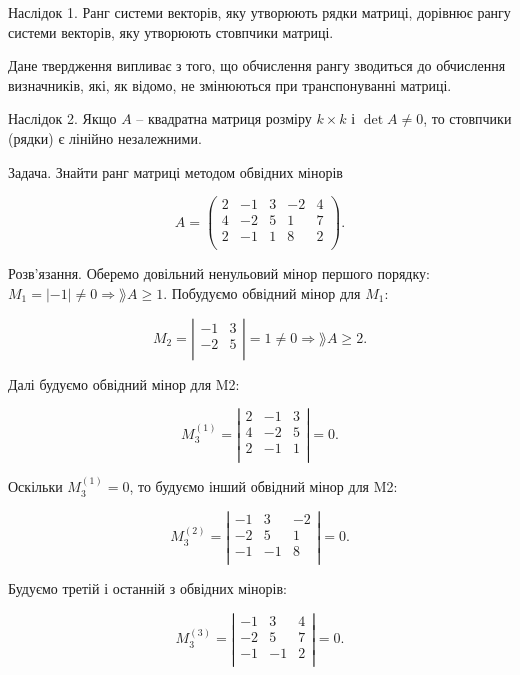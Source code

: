 Наслідок 1. Ранг системи векторів, яку утворюють рядки матриці, дорівнює
рангу системи векторів, яку утворюють стовпчики матриці.


Дане твердження випливає з того, що обчислення рангу зводиться до
обчислення визначників, які, як відомо, не змінюються при транспонуванні
матриці.


Наслідок 2. Якщо $A$ -- квадратна матриця розміру $k \times k$ і $\det A \neq 0$, то
стовпчики (рядки) є лінійно незалежними.


Задача. Знайти ранг матриці методом обвідних мінорів

$$A = \begin{pmatrix}
	2 & -1 & 3 & -2 & 4 \\
	4 & -2 & 5 &  1 & 7 \\
	2 & -1 & 1 &  8 & 2	\\
\end{pmatrix}.$$

Розв’язання. Оберемо довільний ненульовий мінор першого порядку:
$M_1 = |-1| \neq 0 \Rightarrow \rang A \geqslant 1$. Побудуємо обвідний мінор для $M_1$:

$$M_2 = \left| \begin{matrix}
	-1 & 3 \\
	-2 & 5 \\
\end{matrix} \right| =  1 \neq 0 \Rightarrow \rang A \geqslant 2.$$

Далі будуємо обвідний мінор для M2:

$$M_3^{(1)} = \left| \begin{matrix}
	2 & -1 & 3 \\
	4 & -2 & 5 \\
	2 & -1 & 1 \\
\end{matrix} \right| = 0.$$

Оскільки $M_3^{(1)} = 0$, то будуємо інший обвідний мінор для M2:

$$M_3^{(2)} = \left| \begin{matrix}
	-1 &  3 & -2 \\
	-2 &  5 &  1 \\
	-1 & -1 &  8 \\
\end{matrix} \right| = 0.$$

Будуємо третій і останній з обвідних мінорів:

$$M_3^{(3)} = \left| \begin{matrix}
	-1 &  3 & 4 \\
	-2 &  5 & 7 \\
	-1 & -1 & 2 \\
\end{matrix} \right| = 0.$$

